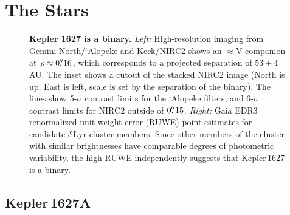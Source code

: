 \documentclass[12pt,modern,twocolumn,tighten,linenumbers]{aastex63}
\begin{document}
\section{The Stars}
\label{sec:stars}

\begin{figure}[tp]
	\begin{center}
		\leavevmode
	\end{center}
	\vspace{-0.5cm}
	\caption{
		{\bf Kepler 1627 is a binary.} {\it Left:} High-resolution imaging
		from Gemini-North/`Alopeke and Keck/NIRC2 shows an $\approx$V
		companion at $\rho \approx 0\mbox{$.\!\!^{\prime\prime}$}16$, which corresponds to a
		projected separation of $53\pm4$\,AU.  The inset shows a cutout of
		the stacked NIRC2 image (North is up, East is left, scale is set
		by the separation of the binary).  The lines show 5-$\sigma$
		contrast limits for the `Alopeke filters, and 6-$\sigma$ contrast
		limits for NIRC2 outside of $0\mbox{$.\!\!^{\prime\prime}$}15$. {\it Right:} Gaia EDR3
		renormalized unit weight error (RUWE) point estimates for
		candidate $\delta$\,Lyr cluster members.  Since other members of
		the cluster with similar brightnesses have comparable degrees of
		photometric variability, the high RUWE independently suggests that
		Kepler\,1627 is a binary. 
		\label{fig:kep1627binary}
	}
\end{figure}

\subsection{Kepler\,1627A}
\end{document}
